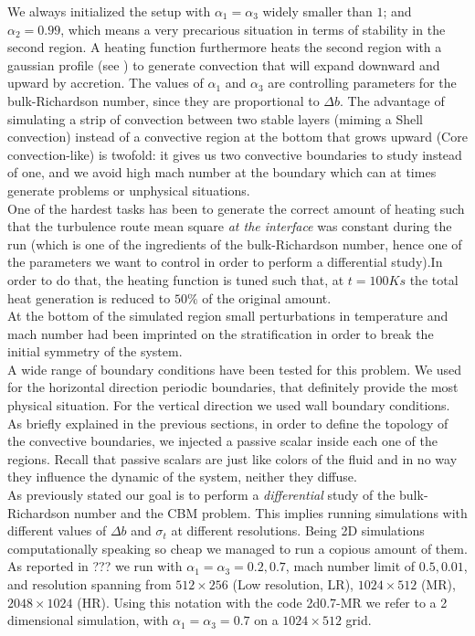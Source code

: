 We always initialized the setup with $\alpha_{1} = \alpha_{3}$ widely smaller than $1$; and $\alpha_{2}=0.99$, which means a very precarious situation in terms of stability in the second region. A heating function furthermore heats the second region with a gaussian profile (see \label{fig:tempprofile}) to generate convection that will expand downward and upward by accretion. The values of $\alpha_{1}$ and $\alpha_{3}$ are controlling parameters for the bulk-Richardson number, since they are proportional to $\Delta b$. The advantage of simulating a strip of convection between two stable layers (miming a Shell convection) instead of a convective region at the bottom that grows upward (Core convection-like) is twofold: it gives us two convective boundaries to study instead of one, and we avoid high mach number at the boundary which can at times generate problems or unphysical situations. \\
One of the hardest tasks has been to generate the correct amount of heating such that the turbulence route mean square \textit{at the interface} was constant during the run (which is one of the ingredients of the bulk-Richardson number, hence one of the parameters we want to control in order to perform a differential study).In order to do that, the heating function is tuned such that, at $t=100K s$ the total heat generation is reduced to $50 \%$ of the original amount.\\ 
At the bottom of the simulated region small perturbations in temperature and mach number had been imprinted on the stratification in order to break the initial symmetry of the system.\\
A wide range of boundary conditions have been tested for this problem. We used for the horizontal direction periodic boundaries, that definitely provide the most physical situation. For the vertical direction we used wall boundary conditions.\\ 
As briefly explained in the previous sections, in order to define the topology of the convective boundaries, we injected a passive scalar inside each one of the regions. Recall that passive scalars are just like colors of the fluid and in no way they influence the dynamic of the system, neither they diffuse.\\
As previously stated our goal is to perform a \textit{differential} study of the bulk-Richardson number and the CBM problem. This implies running simulations with different values of $\Delta b$ and $\sigma_t$ at different resolutions. Being 2D simulations computationally speaking so cheap we managed to run a copious amount of them. As reported in ??? we run with $\alpha_1=\alpha_3=0.2, 0.7$, mach number limit of $0.5, 0.01$, and resolution spanning from $512 \times 256$ (Low resolution, LR), $1024 \times 512$ (MR), $2048 \times 1024$ (HR). Using this notation with the code 2d0.7-MR we refer to a 2 dimensional simulation, with $\alpha_1=\alpha_3=0.7$ on a $1024 \times 512$ grid. \\
